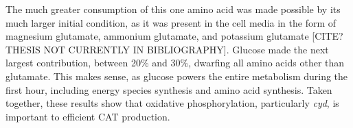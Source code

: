 \documentclass[12pt]{article}
\begin{document}
The much greater consumption of this one amino acid was made possible by its much larger initial condition, as it was present in the cell media in the form of magnesium glutamate, ammonium glutamate, and potassium glutamate [CITE? THESIS NOT CURRENTLY IN BIBLIOGRAPHY].
Glucose made the next largest contribution, between 20\% and 30\%, dwarfing all amino acids other than glutamate.
This makes sense, as glucose powers the entire metabolism during the first hour, including energy species synthesis and amino acid synthesis.
Taken together, these results show that oxidative phosphorylation, particularly \textit{cyd}, is important to efficient CAT production.
\end{document}
